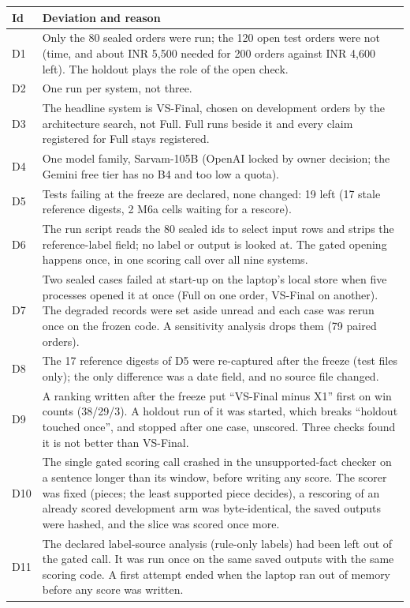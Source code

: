 \documentclass[11pt]{article}
\newcommand{\vs}{VS-Final}
\begin{document}
{\centering\footnotesize
\renewcommand{\arraystretch}{0.88}
\begin{longtable}{@{}lL{14.6cm}@{}}
\toprule
Id & Deviation and reason \\
\midrule
D1 & Only the 80 sealed orders were run; the 120 open test orders were not (time, and about INR 5,500 needed for 200 orders against INR 4,600 left). The holdout plays the role of the open check. \\
D2 & One run per system, not three. \\
D3 & The headline system is \vs{}, chosen on development orders by the architecture search, not Full. Full runs beside it and every claim registered for Full stays registered. \\
D4 & One model family, Sarvam-105B (OpenAI locked by owner decision; the Gemini free tier has no B4 and too low a quota). \\
D5 & Tests failing at the freeze are declared, none changed: 19 left (17 stale reference digests, 2 M6a cells waiting for a rescore). \\
D6 & The run script reads the 80 sealed ids to select input rows and strips the reference-label field; no label or output is looked at. The gated opening happens once, in one scoring call over all nine systems. \\
D7 & Two sealed cases failed at start-up on the laptop's local store when five processes opened it at once (Full on one order, \vs{} on another). The degraded records were set aside unread and each case was rerun once on the frozen code. A sensitivity analysis drops them (79 paired orders). \\
D8 & The 17 reference digests of D5 were re-captured after the freeze (test files only); the only difference was a date field, and no source file changed. \\
D9 & A ranking written after the freeze put ``\vs{} minus X1'' first on win counts (38/29/3). A holdout run of it was started, which breaks ``holdout touched once'', and stopped after one case, unscored. Three checks found it is not better than \vs{}. \\
D10 & The single gated scoring call crashed in the unsupported-fact checker on a sentence longer than its window, before writing any score. The scorer was fixed (pieces; the least supported piece decides), a rescoring of an already scored development arm was byte-identical, the saved outputs were hashed, and the slice was scored once more. \\
D11 & The declared label-source analysis (rule-only labels) had been left out of the gated call. It was run once on the same saved outputs with the same scoring code. A first attempt ended when the laptop ran out of memory before any score was written. \\

\end{longtable}}
\end{document}
